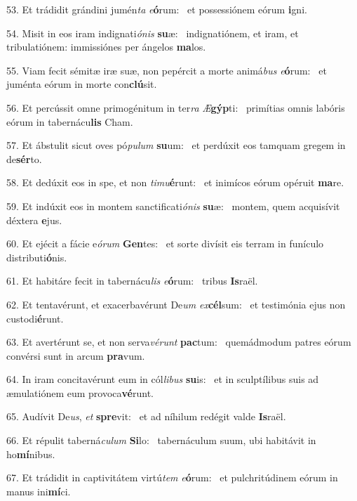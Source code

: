 53. Et trádidit grándini jumén\textit{ta} \textit{e}\textbf{ó}rum: \ast\  et possessiónem eórum \textbf{i}gni.\

54. Misit in eos iram indignati\textit{ó}\textit{nis} \textbf{su}æ: \ast\  indignatiónem, et iram, et tribulatiónem: immissiónes per ángelos \textbf{ma}los.\

55. Viam fecit sémitæ iræ suæ, non pepércit a morte animá\textit{bus} \textit{e}\textbf{ó}rum: \ast\  et juménta eórum in morte con\textbf{clú}sit.\

56. Et percússit omne primogénitum in ter\textit{ra} \textit{Æ}\textbf{gýp}ti: \ast\  primítias omnis labóris eórum in tabernácu\textbf{lis} Cham.\

57. Et ábstulit sicut oves pó\textit{pu}\textit{lum} \textbf{su}um: \ast\  et perdúxit eos tamquam gregem in de\textbf{sér}to.\

58. Et dedúxit eos in spe, et non \textit{ti}\textit{mu}\textbf{é}runt: \ast\  et inimícos eórum opéruit \textbf{ma}re.\

59. Et indúxit eos in montem sanctificati\textit{ó}\textit{nis} \textbf{su}æ: \ast\  montem, quem acquisívit déxtera \textbf{e}jus.\

60. Et ejécit a fácie e\textit{ó}\textit{rum} \textbf{Gen}tes: \ast\  et sorte divísit eis terram in funículo distributi\textbf{ó}nis.\

61. Et habitáre fecit in tabernácu\textit{lis} \textit{e}\textbf{ó}rum: \ast\  tribus \textbf{Is}raël.\

62. Et tentavérunt, et exacerbavérunt De\textit{um} \textit{ex}\textbf{cél}sum: \ast\  et testimónia ejus non custodi\textbf{é}runt.\

63. Et avertérunt se, et non serva\textit{vé}\textit{runt} \textbf{pac}tum: \ast\  quemádmodum patres eórum convérsi sunt in arcum \textbf{pra}vum.\

64. In iram concitavérunt eum in cól\textit{li}\textit{bus} \textbf{su}is: \ast\  et in sculptílibus suis ad æmulatiónem eum provoca\textbf{vé}runt.\

65. Audívit De\textit{us}, \textit{et} \textbf{spre}vit: \ast\  et ad níhilum redégit valde \textbf{Is}raël.\

66. Et répulit taberná\textit{cu}\textit{lum} \textbf{Si}lo: \ast\  tabernáculum suum, ubi habitávit in ho\textbf{mí}nibus.\

67. Et trádidit in captivitátem virtú\textit{tem} \textit{e}\textbf{ó}rum: \ast\  et pulchritúdinem eórum in manus ini\textbf{mí}ci.\

